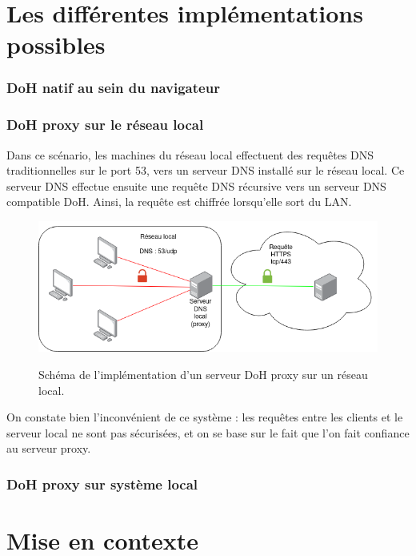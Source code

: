 \documentclass[a4paper,12pt]{article}
\begin{document}
	\section{Les différentes implémentations possibles}
	
	\subsubsection{DoH natif au sein du navigateur}
	
	
	\subsubsection{DoH proxy sur le réseau local}
	
	Dans ce scénario, les machines du réseau local effectuent des requêtes DNS traditionnelles sur le port 53, vers un serveur DNS installé sur le réseau local. Ce serveur DNS effectue ensuite une requête DNS récursive vers un serveur DNS compatible DoH. Ainsi, la requête est chiffrée lorsqu'elle sort du LAN.
	
	\begin{figure}[H]
		\begin{center}
			{\includegraphics[scale=0.6]{Images/schema_doh_proxy_lan.png}}
		\end{center}
		\caption{Schéma de l'implémentation d'un serveur DoH proxy sur un réseau local.}
	\end{figure}
	
	On constate bien l'inconvénient de ce système : les requêtes entre les clients et le serveur local ne sont pas sécurisées, et on se base sur le fait que l'on fait confiance au serveur proxy.
	
	\subsubsection{DoH proxy sur système local}
	
	\section{Mise en contexte}
	
\end{document}
